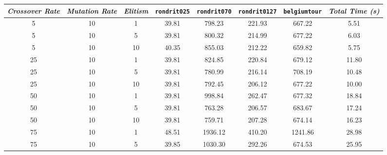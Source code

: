 
\begin{table}[H]
\centering

\footnotesize
{\renewcommand{\arraystretch}{1}}
\begin{tabular}{ccc|c|c|c|c|c}
\textit{Crossover Rate} & \textit{Mutation Rate} & \textit{Elitism} & \texttt{rondrit025} & \texttt{rondrit070} & \texttt{rondrit0127} & \texttt{belgiumtour} & \textit{Total Time (s)} \\\hline
5 & 10 & 1 & \cellcolor{gray!50}39.81 & \cellcolor{gray!38}798.23 & \cellcolor{gray!8}221.93 & \cellcolor{gray!48}667.22 & 5.51\\
5 & 10 & 5 & \cellcolor{gray!50}39.81 & \cellcolor{gray!38}800.32 & \cellcolor{gray!15}214.99 & \cellcolor{gray!45}677.22 & 6.03\\
5 & 10 & 10 & \cellcolor{gray!45}40.35 & \cellcolor{gray!29}855.03 & \cellcolor{gray!17}212.22 & \cellcolor{gray!50}659.82 & 5.75\\
25 & 10 & 1 & \cellcolor{gray!50}39.81 & \cellcolor{gray!34}824.85 & \cellcolor{gray!9}220.84 & \cellcolor{gray!45}679.12 & 11.80\\
25 & 10 & 5 & \cellcolor{gray!50}39.81 & \cellcolor{gray!41}780.99 & \cellcolor{gray!14}216.14 & \cellcolor{gray!36}708.19 & 10.48\\
25 & 10 & 10 & \cellcolor{gray!50}39.81 & \cellcolor{gray!39}792.45 & \cellcolor{gray!23}206.12 & \cellcolor{gray!45}677.22 & 10.00\\
50 & 10 & 1 & \cellcolor{gray!50}39.81 & \cellcolor{gray!5}998.84 & \cellcolor{gray!1}262.47 & \cellcolor{gray!45}677.32 & 18.84\\
50 & 10 & 5 & \cellcolor{gray!50}39.81 & \cellcolor{gray!44}763.28 & \cellcolor{gray!23}206.57 & \cellcolor{gray!43}683.67 & 17.24\\
50 & 10 & 10 & \cellcolor{gray!50}39.81 & \cellcolor{gray!45}759.71 & \cellcolor{gray!22}207.28 & \cellcolor{gray!46}674.14 & 16.23\\
75 & 10 & 1 & \cellcolor{gray!1}48.51 & \cellcolor{gray!1}1936.12 & \cellcolor{gray!1}410.20 & \cellcolor{gray!1}1241.86 & 28.98\\
75 & 10 & 5 & \cellcolor{gray!50}39.85 & \cellcolor{gray!1}1030.30 & \cellcolor{gray!1}292.26 & \cellcolor{gray!46}674.53 & 25.95\\

\end{tabular}
\end{table}
